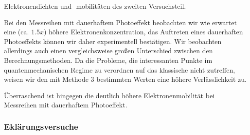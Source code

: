 \begin{table}[h!]
	\centering
	\caption{Elektronendichten und -mobilitäten des zweiten Versuchsteil.}
	
	\label{tab:Photo}
\end{table}
Bei den Messreihen mit dauerhaftem Photoeffekt beobachten wir wie erwartet eine (ca. $1.5x$) höhere Elektronenkonzentration, das Auftreten eines dauerhaften Photoeffekts können wir daher experimentell bestätigen. Wir beobachten allerdings auch einen vergleichsweise großen Unterschied zwischen den Berechnungsmethoden. Da die Probleme, die interessanten Punkte im quantenmechanischen Regime zu verordnen auf das klassische nicht zutreffen, weisen wir den mit Methode 3 bestimmten Werten eine höhere Verlässlichkeit zu. 

Überraschend ist hingegen die deutlich höhere Elektronenmobilität bei Messreihen mit dauerhaftem Photoeffekt. 

\subsubsection{Eklärungsversuche}



